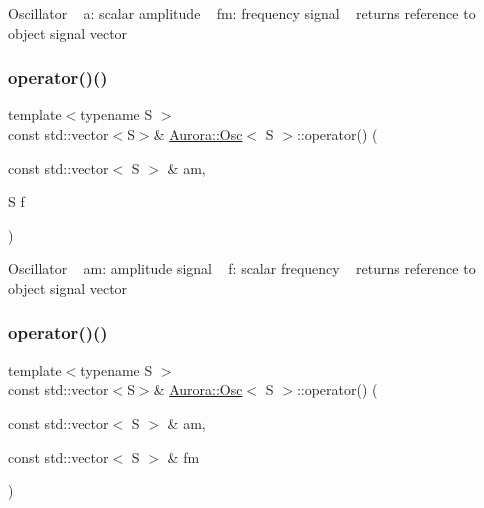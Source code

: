 Oscillator ~\newline
a\+: scalar amplitude ~\newline
fm\+: frequency signal ~\newline
returns reference to object signal vector \mbox{\label{class_aurora_1_1_osc_a28fe97e5634b8a02474657ed456c326b}} 
\subsubsection{\texorpdfstring{operator()()}{operator()()}\hspace{0.1cm}{\footnotesize\ttfamily [3/6]}}
{\footnotesize\ttfamily template$<$typename S $>$ \\
const std\+::vector$<$S$>$\& \hyperlink{class_aurora_1_1_osc}{Aurora\+::\+Osc}$<$ S $>$\+::operator() (\begin{DoxyParamCaption}\item[{const std\+::vector$<$ S $>$ \&}]{am,  }\item[{S}]{f }\end{DoxyParamCaption})\hspace{0.3cm}{\ttfamily [inline]}}

Oscillator ~\newline
am\+: amplitude signal ~\newline
f\+: scalar frequency ~\newline
returns reference to object signal vector \mbox{\label{class_aurora_1_1_osc_a06f9ead5fbf828f7ebb8617ac6cb24b4}} 
\subsubsection{\texorpdfstring{operator()()}{operator()()}\hspace{0.1cm}{\footnotesize\ttfamily [4/6]}}
{\footnotesize\ttfamily template$<$typename S $>$ \\
const std\+::vector$<$S$>$\& \hyperlink{class_aurora_1_1_osc}{Aurora\+::\+Osc}$<$ S $>$\+::operator() (\begin{DoxyParamCaption}\item[{const std\+::vector$<$ S $>$ \&}]{am,  }\item[{const std\+::vector$<$ S $>$ \&}]{fm }\end{DoxyParamCaption})\hspace{0.3cm}{\ttfamily [inline]}}

